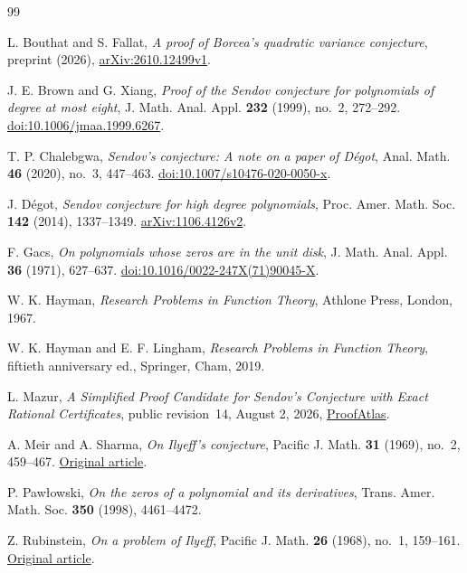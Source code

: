 \begin{thebibliography}{99}

L. Bouthat and S. Fallat, \emph{A proof of Borcea's quadratic variance
conjecture}, preprint (2026), \href{https://arxiv.org/abs/2610.12499v1}{arXiv:2610.12499v1}.

J. E. Brown and G. Xiang, \emph{Proof of the Sendov conjecture for
polynomials of degree at most eight}, J. Math. Anal. Appl.
\textbf{232} (1999), no.~2, 272--292.
\href{https://doi.org/10.1006/jmaa.1999.6267}{doi:10.1006/jmaa.1999.6267}.

T. P. Chalebgwa, \emph{Sendov's conjecture: A note on a paper of
D\'egot}, Anal. Math. \textbf{46} (2020), no.~3, 447--463.
\href{https://doi.org/10.1007/s10476-020-0050-x}{doi:10.1007/s10476-020-0050-x}.

J. D\'egot, \emph{Sendov conjecture for high degree polynomials},
Proc. Amer. Math. Soc. \textbf{142} (2014), 1337--1349.
\href{https://arxiv.org/abs/1106.4126v2}{arXiv:1106.4126v2}.

F. Gacs, \emph{On polynomials whose zeros are in the unit disk},
J. Math. Anal. Appl. \textbf{36} (1971), 627--637.
\href{https://doi.org/10.1016/0022-247X(71)90045-X}{doi:10.1016/0022-247X(71)90045-X}.

W. K. Hayman, \emph{Research Problems in Function Theory},
Athlone Press, London, 1967.

W. K. Hayman and E. F. Lingham, \emph{Research Problems in Function
Theory}, fiftieth anniversary ed., Springer, Cham, 2019.

L. Mazur, \emph{A Simplified Proof Candidate for Sendov's Conjecture
with Exact Rational Certificates}, public revision~14, August 2, 2026,
\href{https://www.proofatlas.ai/research/sendov-conjecture-proof-candidate/}{ProofAtlas}.

A. Meir and A. Sharma, \emph{On Ilyeff's conjecture},
Pacific J. Math. \textbf{31} (1969), no.~2, 459--467.
\href{https://msp.org/pjm/1969/31-2/pjm-v31-n2-p20-s.pdf}{Original article}.

P. Paw{\l}owski, \emph{On the zeros of a polynomial and its derivatives},
Trans. Amer. Math. Soc. \textbf{350} (1998), 4461--4472.

Z. Rubinstein, \emph{On a problem of Ilyeff}, Pacific J. Math.
\textbf{26} (1968), no.~1, 159--161.
\href{https://msp.org/pjm/1968/26-1/pjm-v26-n1-p18-s.pdf}{Original article}.


\end{thebibliography}
